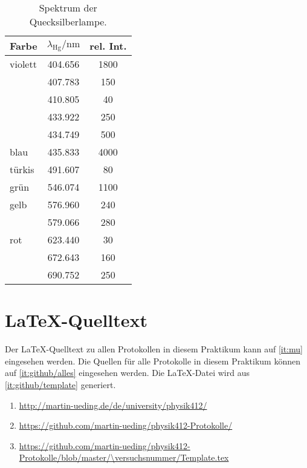 \begin{appendix}
    \begin{table}[htbp]
        \centering
        \begin{tabular}{lSS}
            Farbe & {$\lambda_\text{Hg} / \si{\nano\meter}$} & {rel. Int.} \\
            \midrule
            violett & 404.656 & 1800 \\
                    & 407.783 & 150 \\
                    & 410.805 & 40 \\
                    & 433.922 & 250 \\
                    & 434.749 & 500 \\
            blau & 435.833 & 4000 \\
            türkis & 491.607 & 80 \\
            grün & 546.074 & 1100 \\
            gelb & 576.960 & 240 \\
                 & 579.066 & 280 \\
            rot & 623.440 & 30 \\
                & 672.643 & 160 \\
                & 690.752 & 250
        \end{tabular}
        \caption{%
            Spektrum der Quecksilberlampe.
            \parencite[P402.6.1]{physik412-Anleitung}
        }
        \label{tab:messdaten:gitterkonstante}
    \end{table}

    \FloatBarrier
    \section{\LaTeX-Quelltext}

    Der \LaTeX-Quelltext zu allen Protokollen in diesem Praktikum kann auf
    \ref{it:mu} eingesehen werden. Die Quellen für alle Protokolle in diesem
    Praktikum können auf \ref{it:github/alles} eingesehen werden. Die
    \LaTeX-Datei wird aus \ref{it:github/template} generiert.

    \begin{enumerate}
        \item
            \label{it:mu}
            \url{http://martin-ueding.de/de/university/physik412/}
        \item
            \label{it:github/alles}
            \url{https://github.com/martin-ueding/physik412-Protokolle/}
        \item
            \label{it:github/template}
            \url{https://github.com/martin-ueding/physik412-Protokolle/blob/master/\versuchsnummer/Template.tex}
    \end{enumerate}
\end{appendix}


\FloatBarrier
\printbibliography



